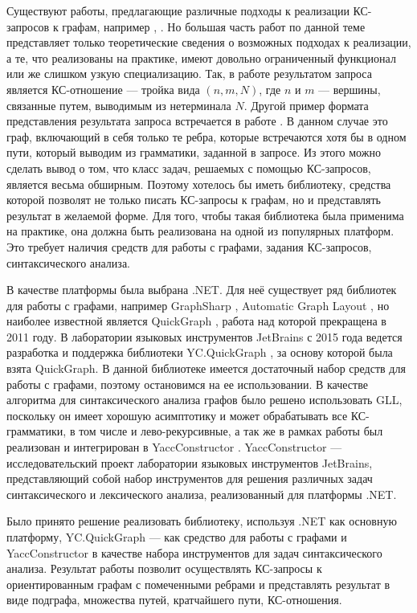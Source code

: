 \documentclass[14pt]{matmex-diploma-custom}
\begin{document}
	Существуют работы, предлагающие различные подходы к реализации КС-запросов к графам, например \cite{sevon2008subgraph}, \cite{hellings2014conjunctive}. Но большая часть работ по данной теме представляет только теоретические сведения о возможных подходах к реализации, а те, что реализованы на практике, имеют довольно ограниченный функционал или же слишком узкую специализацию. Так, в работе \cite{hellings2014conjunctive} результатом запроса является КС-отношение --- тройка вида \((n, m, N)\), где \(n\) и \(m\) --- вершины, связанные путем, выводимым из нетерминала \(N\). Другой пример формата представления результата запроса встречается в работе \cite{sevon2008subgraph}. В данном случае это граф, включающий в себя только те ребра, которые встречаются хотя бы в одном пути, который выводим из грамматики, заданной в запросе. Из этого можно сделать вывод о том, что класс задач, решаемых с помощью КС-запросов, является весьма обширным. Поэтому хотелось бы иметь библиотеку, средства которой позволят не только писать КС-запросы к графам, но и представлять результат в желаемой форме. Для того, чтобы такая библиотека была применима на практике, она должна быть реализована на одной из популярных платформ. Это требует наличия средств для работы с графами, задания КС-запросов, синтаксического анализа.
	
	В качестве платформы была выбрана .NET. Для неё существует ряд библиотек для работы с графами, например GraphSharp \cite{graphsharp}, Automatic Graph Layout \cite{agl}, но наиболее известной является QuickGraph \cite{quickgraph}, работа над которой прекращена в 2011 году. В лаборатории языковых инструментов JetBrains с 2015 года ведется разработка и поддержка библиотеки YC.QuickGraph \cite{YC.QuickGraph}, за основу которой была взята QuickGraph. В данной библиотеке имеется достаточный набор средств для работы с графами, поэтому остановимся на ее использовании. В качестве алгоритма для синтаксического анализа графов было решено использовать GLL\cite{gll}, поскольку он имеет хорошую асимптотику и может обрабатывать все КС-грамматики, в том числе и лево-рекурсивные, а так же в рамках работы \cite{ragRelaxedParsing} был реализован и интегрирован в YaccConstructor \cite{YaccConstructorPage}. YaccConstructor --- исследовательский проект лаборатории языковых инструментов JetBrains, представляющий собой набор инструментов для решения различных задач синтаксического и лексического анализа, реализованный для платформы .NET.
	
	Было принято решение реализовать библиотеку, используя .NET как основную платформу, YC.QuickGraph --- как средство для работы с графами и YaccConstructor в качестве набора инструментов для задач синтаксического анализа. Результат работы позволит осуществлять КС-запросы к ориентированным графам с помеченными ребрами и представлять результат в виде подграфа, множества путей, кратчайшего пути, КС-отношения.
	
\end{document}
